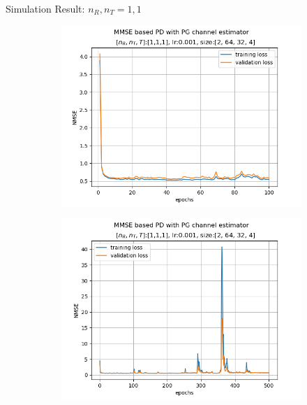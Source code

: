 \documentclass[hyperref={bookmarks=false}]{beamer}
\numberwithin{figure}{section}
\begin{document}
\begin{frame}{Simulation Result: $n_R, n_T = 1, 1$}

\begin{figure}[h!]
    \begin{subfigure}[b]{0.33\linewidth}
      \includegraphics[width=\linewidth]{figures/240502/lr0.001_[2, 64, 32, 4]_ep100.png}
    \end{subfigure}
    \begin{subfigure}[b]{0.33\linewidth}
      \includegraphics[width=\linewidth]{figures/240502/lr0.001_[2, 64, 32, 4]_ep500.png}

\end{subfigure}
\end{figure}
\end{frame}
\end{document}
